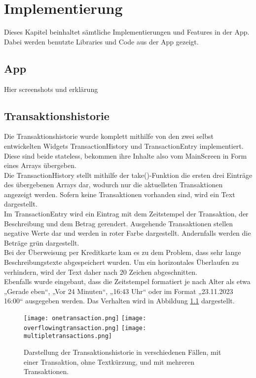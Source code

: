 
\chapter{Implementierung}

Dieses Kapitel beinhaltet sämtliche Implementierungen und Features in der App.
Dabei werden benutzte Libraries und Code aus der App gezeigt.

\section{App}

Hier screenshots und erklärung

\section{Transaktionshistorie}
Die Transaktionshistorie wurde komplett mithilfe von den zwei selbst entwickelten Widgets TransactionHistory und TransactionEntry implementiert.
Diese sind beide stateless, bekommen ihre Inhalte also vom MainScreen in Form eines Arrays übergeben.\\
Die TransactionHistory stellt mithilfe der take()-Funktion die ersten drei Einträge des übergebenen Arrays dar, wodurch nur die aktuellsten Transaktionen angezeigt werden.
Sofern keine Transaktionen vorhanden sind, wird ein Text dargestellt.\\
Im TransactionEntry wird ein Eintrag mit dem Zeitstempel der Transaktion, der Beschreibung und dem Betrag gerendert.
Ausgehende Transaktionen stellen negative Werte dar und werden in roter Farbe dargestellt.
Andernfalls werden die Beträge grün dargestellt.\\
Bei der Überweisung per Kreditkarte kam es zu dem Problem, dass sehr lange Beschreibungstexte abgespeichert wurden.
Um ein horizontales Überlaufen zu verhindern, wird der Text daher nach 20 Zeichen abgeschnitten.\\
Ebenfalls wurde eingebaut, dass die Zeitstempel formatiert je nach Alter als etwa „Gerade eben“, „Vor 24 Minuten“, „16:43 Uhr“ oder im Format „23.11.2023 16:00“ ausgegeben werden.
Das Verhalten wird in Abbildung \ref{fig:transactionhistory} dargestellt.

\begin{figure}[H]
  \centering
  \texttt{[image: onetransaction.png]}
  \texttt{[image: overflowingtransaction.png]}
  \texttt{[image: multipletransactions.png]}
  \label{fig:transactionhistory}
  \caption{Darstellung der Transaktionshistorie in verschiedenen Fällen, mit einer Transaktion, ohne Textkürzung, und mit mehreren Transaktionen.}
\end{figure}


